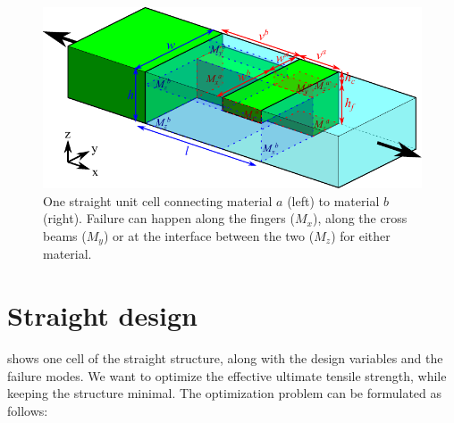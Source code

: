 
\newcommand{\hc}{h_\text{c}}
\newcommand{\hf}{h_\text{f}}

\newcommand{\sigmafail}{\sigma_\text{y}}
\newcommand{\taufail}{\tau_\text{y}}
\newcommand{\tauz}{\tau_\text{yZ}}

\begin{figure}[H]
	\centering
	\includegraphics[width=\columnwidth]{sources/method/straight_model_v3.pdf}
	\caption{
		One straight unit cell connecting material $a$ (left) to material $b$ (right).
		Failure can happen along the fingers ($M_x$), along the cross beams ($M_y$) or at the interface between the two ($M_z$) for either material.}
	\label{fig:failure_modes}
\end{figure}


\section{Straight design}

 shows one cell of the straight structure, along with the design variables and the failure modes.
We want to optimize the effective ultimate tensile strength, while keeping the structure minimal.
The optimization problem can be formulated as follows:

